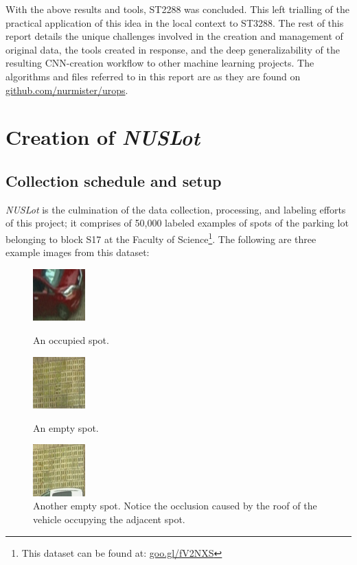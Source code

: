 \documentclass[a4paper, 11pt]{article} %
\begin{document}
	\newpage
	With the above results and tools, ST2288 was concluded. This left trialling of the practical 
	application of this idea in the local context to ST3288. The rest of this report details the unique 
	challenges involved in the creation and management of original data, the tools created in response, 
	and the deep generalizability of the resulting CNN-creation workflow to other machine learning 
	projects. The algorithms and files referred to in this report are as they are found on  
	\hyperlink{https://github.com/nurmister/urops}{github.com/nurmister/urops}.
\newpage
\section{Creation of \textit{NUSLot}}
	\subsection{Collection schedule and setup}
		\textit{NUSLot} is the culmination of the data collection, processing, and labeling efforts of this 
		project; it comprises of 50,000 labeled examples of spots of the parking lot belonging to block 
		S17 at the Faculty of Science\footnote{This dataset can be found at: 
		\hyperlink{https://goo.gl/fV2NXS}{goo.gl/fV2NXS}}. The following are three example images 
		from this dataset:
		\vskip 5mm
		\begin{figure}[H]
			\centering
			\includegraphics[width=2cm]{figures/nuslot_example_1.jpg}
			\caption{An occupied spot.}
			\vspace{5mm}
			\includegraphics[width=2cm]{figures/nuslot_example_2.jpg}
			\caption{An empty spot.}
			\vspace{5mm}
			\includegraphics[width=2cm]{figures/nuslot_example_3.jpg}
			\caption{Another empty spot. Notice the occlusion caused by the roof of the vehicle occupying 
			the adjacent spot.}
		\end{figure}
\end{document}
